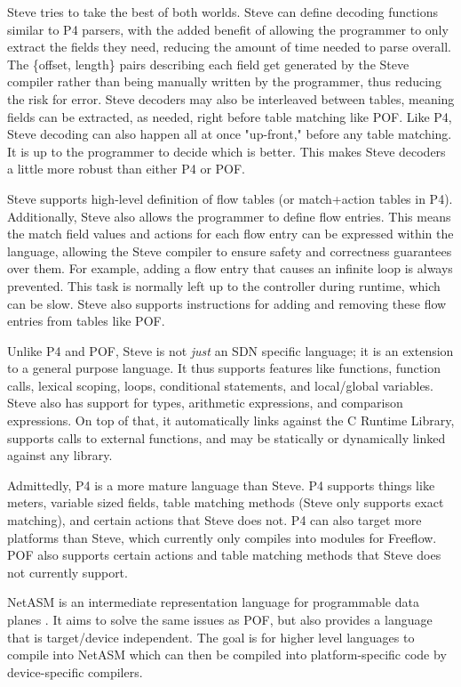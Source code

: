 Steve tries to take the best of both worlds. Steve can define decoding functions
similar to P4 parsers, with the added benefit of allowing the programmer to only
extract the fields they need, reducing the amount of time needed to parse
overall. The \{offset, length\} pairs describing each field get generated by the
Steve compiler rather than being manually written by the programmer, thus
reducing
the risk for error. Steve decoders may also be interleaved between tables,
meaning fields can be extracted, as needed, right before table matching like
POF. Like P4,
Steve decoding can also happen all at once "up-front," before any table
matching.
It is up to the programmer to decide which is better. This makes Steve
decoders a little more robust than either P4 or POF.

Steve supports high-level definition of flow tables (or match+action tables in
P4). Additionally, Steve also allows the programmer to define flow entries. This
means the match field values and actions for each flow entry can be expressed
within the language, allowing the Steve compiler to ensure safety and
correctness guarantees over them. For example, adding a flow entry that causes
an infinite loop is always prevented. This task is normally left up to the
controller during runtime, which can be slow. Steve also supports instructions
for adding and removing these flow entries from tables like POF.

Unlike P4 and POF, Steve is not \textit{just} an SDN specific language; it is an
extension to a general purpose language. It thus supports features like
functions, function calls, lexical scoping, loops, conditional statements, and
local/global variables. Steve also has support for types, arithmetic
expressions, and comparison expressions. On top of that, it automatically links
against the C Runtime Library, supports calls to external functions, and may be
statically or dynamically linked against any library.

Admittedly, P4 is a more mature language than Steve. P4 supports things like
meters, variable sized fields, table matching methods (Steve only supports exact
matching), and certain actions that Steve does not. P4 can also target more
platforms than Steve, which currently only compiles into modules for Freeflow.
POF also supports certain actions and table matching methods that Steve does not
currently support.

NetASM is an intermediate representation language for programmable data planes
\cite{shahbaz2015netasm}. It aims to solve the same issues as POF, but also provides a language that is target/device independent. The goal is for higher level languages to compile into NetASM which can then be compiled into platform-specific code by device-specific compilers.

